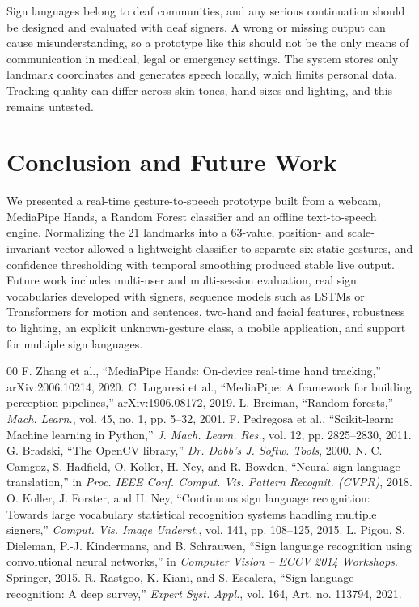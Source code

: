 \documentclass[conference]{IEEEtran}
\begin{document}
Sign languages belong to deaf communities, and any serious continuation should be designed and evaluated with deaf signers. A wrong or missing output can cause misunderstanding, so a prototype like this should not be the only means of communication in medical, legal or emergency settings. The system stores only landmark coordinates and generates speech locally, which limits personal data. Tracking quality can differ across skin tones, hand sizes and lighting, and this remains untested.

\section{Conclusion and Future Work}
We presented a real-time gesture-to-speech prototype built from a webcam, MediaPipe Hands, a Random Forest classifier and an offline text-to-speech engine. Normalizing the 21 landmarks into a 63-value, position- and scale-invariant vector allowed a lightweight classifier to separate six static gestures, and confidence thresholding with temporal smoothing produced stable live output. Future work includes multi-user and multi-session evaluation, real sign vocabularies developed with signers, sequence models such as LSTMs or Transformers for motion and sentences, two-hand and facial features, robustness to lighting, an explicit unknown-gesture class, a mobile application, and support for multiple sign languages.

\begin{thebibliography}{00}
 F. Zhang et al., ``MediaPipe Hands: On-device real-time hand tracking,'' arXiv:2006.10214, 2020.
 C. Lugaresi et al., ``MediaPipe: A framework for building perception pipelines,'' arXiv:1906.08172, 2019.
 L. Breiman, ``Random forests,'' \textit{Mach. Learn.}, vol. 45, no. 1, pp. 5--32, 2001.
 F. Pedregosa et al., ``Scikit-learn: Machine learning in Python,'' \textit{J. Mach. Learn. Res.}, vol. 12, pp. 2825--2830, 2011.
 G. Bradski, ``The OpenCV library,'' \textit{Dr. Dobb's J. Softw. Tools}, 2000.
 N. C. Camgoz, S. Hadfield, O. Koller, H. Ney, and R. Bowden, ``Neural sign language translation,'' in \textit{Proc. IEEE Conf. Comput. Vis. Pattern Recognit. (CVPR)}, 2018.
 O. Koller, J. Forster, and H. Ney, ``Continuous sign language recognition: Towards large vocabulary statistical recognition systems handling multiple signers,'' \textit{Comput. Vis. Image Underst.}, vol. 141, pp. 108--125, 2015.
 L. Pigou, S. Dieleman, P.-J. Kindermans, and B. Schrauwen, ``Sign language recognition using convolutional neural networks,'' in \textit{Computer Vision -- ECCV 2014 Workshops}. Springer, 2015.
 R. Rastgoo, K. Kiani, and S. Escalera, ``Sign language recognition: A deep survey,'' \textit{Expert Syst. Appl.}, vol. 164, Art. no. 113794, 2021.
\end{thebibliography}
\end{document}
